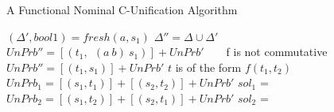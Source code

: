 \begin{frame}[allowframebreaks]{A Functional Nominal C-Unification Algorithm}
\begin{algorithmic}[1]
                    \State $(\Delta', bool1) =  fresh(a, s_1)$ 
                    \State $\Delta'' = \Delta \cup \Delta'$ 
                    \State $UnPrb'' = [(t_1, \ \ (a \ b) \ s_1)] + UnPrb'$ 
                        \State {}
                    \Else \ 
                    \EndIf
                \Else \ 
                \EndIf
             \Comment f is not commutative
                 
                \Else 
                    \State $UnPrb'' = [(t_1, s_1)] + UnPrb'$ 
                    \State {}
                \EndIf
            \Statex\Statex\Statex\Statex
            \Statex\Statex
            \Else \Comment $t$ is of the form $f(t_1, t_2)$
                 
                \Else
                    \State $UnPrb_1 = [(s_1, t_1)] + [(s_2, t_2)] + UnPrb'$
                    \State $sol_1$ = 
                    \State $UnPrb_2 = [(s_1, t_2)] + [(s_2, t_1)] + UnPrb'$
                    \State $sol_2$ = 
                    \State {}
                \EndIf
            \EndIf
        \EndIf
    \EndIf
\EndProcedure
\end{algorithmic}
\end{frame}

